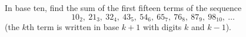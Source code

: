 In base ten, find the sum of the first fifteen terms of the sequence
\[
10_2,\ 21_3,\ 32_4,\ 43_5,\ 54_6,\ 65_7,\ 76_8,\ 87_9,\ 98_{10},\ \dots
\]
(the $k$th term is written in base $k+1$ with digits $k$ and $k-1$).
